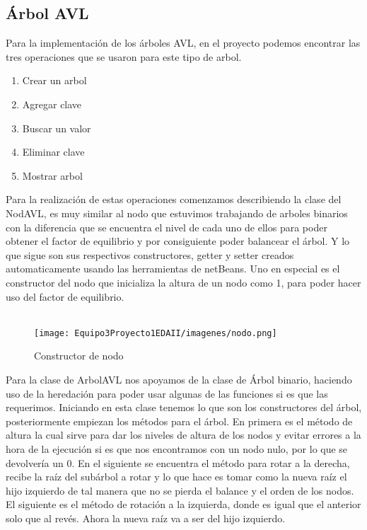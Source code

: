 \documentclass{report}
\begin{document}
\subsection{Árbol AVL}
Para la implementación de los árboles AVL, en el proyecto podemos encontrar las tres operaciones que se usaron para este tipo de arbol.
\begin{enumerate}
    \item Crear un arbol
    \item Agregar clave
    \item Buscar un valor
    \item Eliminar clave
    \item Mostrar arbol
\end{enumerate}
Para la realización de estas operaciones comenzamos describiendo la clase del NodAVL, es muy similar al nodo que estuvimos trabajando de arboles binarios con la diferencia que se encuentra el nivel de cada uno de ellos para poder obtener el factor de equilibrio y por consiguiente poder balancear el árbol. Y lo que sigue son sus respectivos constructores, getter y setter creados automaticamente usando las herramientas de netBeans. Uno en especial es el constructor del nodo que inicializa la altura de un nodo como 1, para poder hacer uso del factor de equilibrio.\\\
\begin{figure}[h]
        \centering
        \texttt{[image: Equipo3Proyecto1EDAII/imagenes/nodo.png]}
        \caption{Constructor de nodo}
        \label{fig:my_label}
\end{figure}
Para la clase de ArbolAVL nos apoyamos de la clase de Árbol binario, haciendo uso de la heredación para poder usar algunas de las funciones si es que las requerimos. Iniciando en esta clase tenemos lo que son los constructores del árbol, posteriormente empiezan los métodos para el árbol. En primera es el método de altura la cual sirve para dar los niveles de altura de los nodos y evitar errores a la hora de la ejecución si es que nos encontramos con un nodo nulo, por lo que se devolvería un 0.
En el siguiente se encuentra el método para rotar a la derecha, recibe la raíz del subárbol a rotar y lo que hace es tomar como la nueva raíz el hijo izquierdo de tal manera que no se pierda el balance y el orden de los nodos.
El siguiente es el método de rotación a la izquierda, donde es igual que el anterior solo que al revés. Ahora la nueva raíz va a ser del hijo izquierdo.\\\
\end{document}
